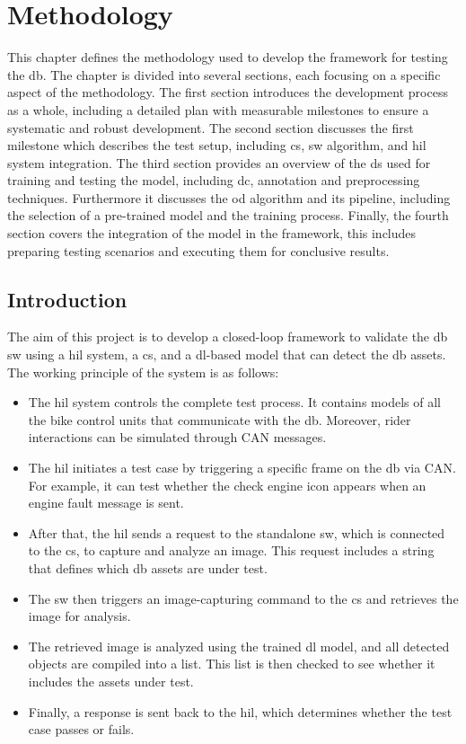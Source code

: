 

\chapter{Methodology} \label{ch:methodology}
This chapter defines the methodology used to develop the framework for testing the \gls{db}. The chapter is divided into several sections, each focusing on a specific aspect of the methodology. The first section introduces the development process as a whole, including a detailed plan with measurable milestones to ensure a systematic and robust development. The  second section discusses the first milestone which describes the test setup, including \gls{cs}, \gls{sw} algorithm, and \gls{hil} system integration. The third section provides an overview of the \gls{ds} used for training and testing the model, including \gls{dc}, annotation and preprocessing techniques. Furthermore it discusses the \gls{od} algorithm and its pipeline, including the selection of a pre-trained model and the training process. Finally, the fourth section covers the integration of the model in the framework, this includes preparing testing scenarios and executing them for conclusive results.

\section{Introduction}
The aim of this project is to develop a closed-loop framework to validate the \gls{db} \gls{sw} using a \gls{hil} system, a \gls{cs}, and a \gls{dl}-based model that can detect the \gls{db} assets. The working principle of the system is as follows:

\begin{itemize}
    \item The \gls{hil} system controls the complete test process. It contains models of all the bike control units that communicate with the \gls{db}. Moreover, rider interactions can be simulated through CAN messages.
    \item The \gls{hil} initiates a test case by triggering a specific frame on the \gls{db} via CAN. For example, it can test whether the check engine icon appears when an engine fault message is sent.
    \item After that, the \gls{hil} sends a request to the standalone \gls{sw}, which is connected to the \gls{cs}, to capture and analyze an image. This request includes a string that defines which \gls{db} assets are under test.
    \item The \gls{sw} then triggers an image-capturing command to the \gls{cs} and retrieves the image for analysis.
    \item The retrieved image is analyzed using the trained \gls{dl} model, and all detected objects are compiled into a list. This list is then checked to see whether it includes the assets under test.
    \item Finally, a response is sent back to the \gls{hil}, which determines whether the test case passes or fails.
\end{itemize}

